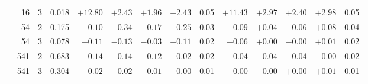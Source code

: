 \documentclass[11pt,aps,preprint,nofootinbib,superscriptaddress,tightenlines]{revtex4-2}
\begin{document}
\begin{table}[h]
\begin{center}
\begin{tabular}{lrrr|rrrrr|rrrrr}
 & 16 & 3 & 0.018 & $+12.80$ & $+2.43$ & $+1.96$ & $+2.43$ & 0.05 & $+11.43$ & $+2.97$ & $+2.40$ & $+2.98$ & 0.05 \\
 & 54 & 2 & 0.175 & $-0.10$ & $-0.34$ & $-0.17$ & $-0.25$ & 0.03 & $+0.09$ & $+0.04$ & $-0.06$ & $+0.08$ & 0.04 \\
 & 54 & 3 & 0.078 & $+0.11$ & $-0.13$ & $-0.03$ & $-0.11$ & 0.02 & $+0.06$ & $+0.00$ & $-0.00$ & $+0.01$ & 0.02 \\
 & 541 & 2 & 0.683 & $-0.14$ & $-0.14$ & $-0.12$ & $-0.02$ & 0.02 & $-0.04$ & $-0.04$ & $-0.04$ & $-0.00$ & 0.02 \\
 & 541 & 3 & 0.304 & $-0.02$ & $-0.02$ & $-0.01$ & $+0.00$ & 0.01 & $-0.00$ & $-0.00$ & $+0.00$ & $+0.01$ & 0.01 \\
\bottomrule
\end{tabular}
\end{center}
\end{table}
\end{document}
